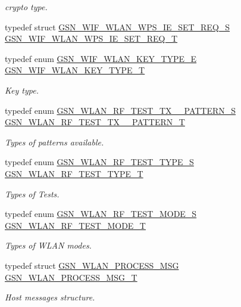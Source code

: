 \begin{DoxyCompactItemize}
\begin{DoxyCompactList}\small\item\em crypto type. \end{DoxyCompactList}\item 
typedef struct \hyperlink{a00415}{GSN\_\-WIF\_\-WLAN\_\-WPS\_\-IE\_\-SET\_\-REQ\_\-S} \hyperlink{a00677_ga07d4ca8f04e21011d1e7b071ee2b376a}{GSN\_\-WIF\_\-WLAN\_\-WPS\_\-IE\_\-SET\_\-REQ\_\-T}
\item 
typedef enum \hyperlink{a00677_ga738f68b803d29587618534b884d8b600}{GSN\_\-WIF\_\-WLAN\_\-KEY\_\-TYPE\_\-E} \hyperlink{a00677_gab0871ec1fe022833d9573d32749bd7c4}{GSN\_\-WIF\_\-WLAN\_\-KEY\_\-TYPE\_\-T}
\begin{DoxyCompactList}\small\item\em Key type. \end{DoxyCompactList}\item 
typedef enum \hyperlink{a00677_ga651010efc8cff4e360fd72c7d32a70a9}{GSN\_\-WLAN\_\-RF\_\-TEST\_\-TX\_\_\-PATTERN\_\-S} \hyperlink{a00677_gaf2d0e783b6db5c93a78ee3d99153ebcb}{GSN\_\-WLAN\_\-RF\_\-TEST\_\-TX\_\_\-PATTERN\_\-T}
\begin{DoxyCompactList}\small\item\em Types of patterns available. \end{DoxyCompactList}\item 
typedef enum \hyperlink{a00677_ga3c5fd791827dffd656e69ad09ce2304e}{GSN\_\-WLAN\_\-RF\_\-TEST\_\-TYPE\_\-S} \hyperlink{a00677_ga58d933da4429968a4151ae6b2106281b}{GSN\_\-WLAN\_\-RF\_\-TEST\_\-TYPE\_\-T}
\begin{DoxyCompactList}\small\item\em Types of Tests. \end{DoxyCompactList}\item 
typedef enum \hyperlink{a00677_ga8d2c2dc6c9f7927c5cf4634d7b403b95}{GSN\_\-WLAN\_\-RF\_\-TEST\_\-MODE\_\-S} \hyperlink{a00677_ga05896005da162a0b0f4b304f7c551947}{GSN\_\-WLAN\_\-RF\_\-TEST\_\-MODE\_\-T}
\begin{DoxyCompactList}\small\item\em Types of WLAN modes. \end{DoxyCompactList}\item 
typedef struct \hyperlink{a00418}{GSN\_\-WLAN\_\-PROCESS\_\-MSG} \hyperlink{a00677_gaabf8bae549f7aca1d1a07fbc8f2d4459}{GSN\_\-WLAN\_\-PROCESS\_\-MSG\_\-T}
\begin{DoxyCompactList}\small\item\em Host messages structure. \end{DoxyCompactList}\item 

\end{DoxyCompactItemize}
